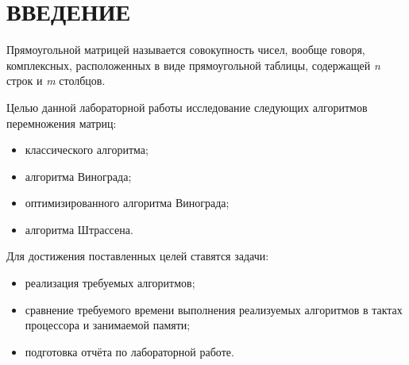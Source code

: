\section*{ВВЕДЕНИЕ}

Прямоугольной матрицей называется совокупность чисел, вообще говоря, комплексных, расположенных в виде прямоугольной таблицы, содержащей \textit{n} строк и \textit{m} столбцов. \cite{faddev}

Целью данной лабораторной работы исследование следующих алгоритмов перемножения матриц:

\begin{itemize}
	\item классического алгоритма;
	\item алгоритма Винограда;
	\item оптимизированного алгоритма Винограда;
	\item алгоритма Штрассена.
\end{itemize}

Для достижения поставленных целей ставятся задачи:

\begin{itemize}
	\item реализация требуемых алгоритмов;
	\item сравнение требуемого времени выполнения реализуемых алгоритмов в тактах процессора и занимаемой памяти;
	\item подготовка отчёта по лабораторной работе.
\end{itemize}